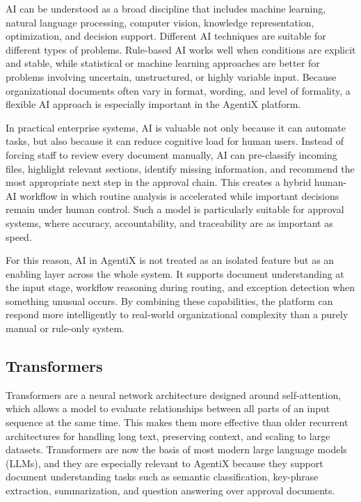 \documentclass[12pt,oneside,openright,a4paper]{cpe-english-project}
\begin{document}
AI can be understood as a broad discipline that includes machine
learning, natural language processing, computer vision, knowledge
representation, optimization, and decision support. Different AI
techniques are suitable for different types of problems. Rule-based AI
works well when conditions are explicit and stable, while statistical or
machine learning approaches are better for problems involving uncertain,
unstructured, or highly variable input. Because organizational documents
often vary in format, wording, and level of formality, a flexible AI
approach is especially important in the AgentiX platform.

In practical enterprise systems, AI is valuable not only because it can
automate tasks, but also because it can reduce cognitive load for human
users. Instead of forcing staff to review every document manually, AI
can pre-classify incoming files, highlight relevant sections, identify
missing information, and recommend the most appropriate next step in the
approval chain. This creates a hybrid human-AI workflow in which routine
analysis is accelerated while important decisions remain under human
control. Such a model is particularly suitable for approval systems,
where accuracy, accountability, and traceability are as important as
speed.

For this reason, AI in AgentiX is not treated as an isolated feature but
as an enabling layer across the whole system. It supports document
understanding at the input stage, workflow reasoning during routing, and
exception detection when something unusual occurs. By combining these
capabilities, the platform can respond more intelligently to real-world
organizational complexity than a purely manual or rule-only system.

\vspace{1em}

\subsection{Transformers}

Transformers are a neural network architecture designed around
self-attention, which allows a model to evaluate relationships between
all parts of an input sequence at the same time. This makes them more
effective than older recurrent architectures for handling long text,
preserving context, and scaling to large datasets. Transformers are now
the basis of most modern large language models (LLMs), and they are
especially relevant to AgentiX because they support document
understanding tasks such as semantic classification, key-phrase
extraction, summarization, and question answering over approval
documents.
\end{document}
